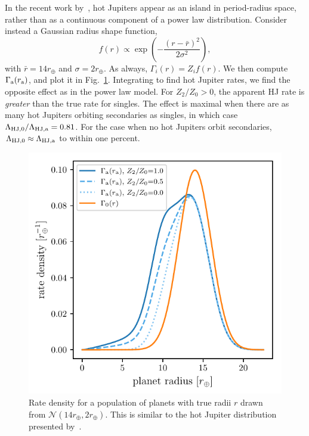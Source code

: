 \documentclass[12pt,modern]{aastex61}
\renewcommand{\a}{_{\rm a}}
\begin{document}
In the recent work by~\citet{petigura_CKS_2017}, hot Jupiters appear as an 
island in period-radius space, rather than as a continuous component of a 
power law distribution.
Consider instead a Gaussian radius shape function,
\begin{equation}
f(r) \propto \exp \left( -\frac{(r-\bar{r})^2}{2\sigma^2} \right),
\end{equation}
with $\bar{r} = 14r_\oplus$ and $\sigma = 2r_\oplus$.
As always, $\Gamma_i(r) = Z_i f(r)$.
We then compute $\Gamma\a(r\a)$, and plot it in Fig.~\ref{fig:gaussian_HJ}.
Integrating to find hot Jupiter rates,
we find the opposite effect as in the power law model.
For $Z_2/Z_0>0$, 
the apparent HJ rate is {\it greater} than the true rate for singles.
The effect is maximal when there are as many hot Jupiters orbiting secondaries 
as singles, in which case
$\Lambda_{{\rm HJ},0}/\Lambda_{\rm HJ,a} = 0.81$.
For the case when no hot Jupiters orbit secondaries, $\Lambda_{{\rm HJ},0} 
\approx \Lambda_{\rm HJ,a}$ to within one percent.

\begin{figure}[!tb]
    \centering
    \includegraphics[width=.6\textwidth]{figures/int_rate_density_vs_radius_model_7_rpu_22.5_manyZs.pdf}
    \caption{
        Rate density for a population of planets with true radii $r$ drawn from
        $\mathcal{N}(14r_\oplus,2r_\oplus)$.
        This is similar to the hot Jupiter distribution presented 
        by~\citet{petigura_CKS_2017}.
    }
    \label{fig:gaussian_HJ}
\end{figure}


%
\end{document}
